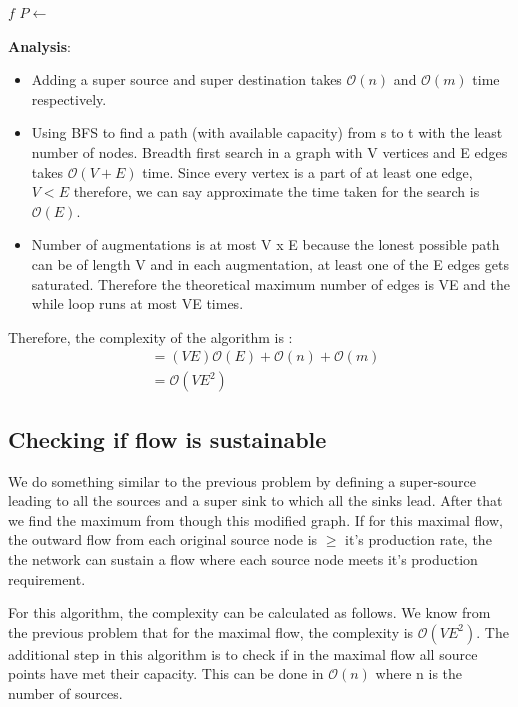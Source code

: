 \documentclass{article}
\begin{document}
\begin{algorithmic}
	\State {} $f$
		\State $P \gets $ 
		\State {}
		\State {}
		\State {}
	\EndWhile
\EndFunction
\end{algorithmic}

\textbf{Analysis}: 
\begin{itemize}
\item Adding a super source and super destination takes $\mathcal{O}(n)$ and $\mathcal{O}(m)$ time respectively.
\item Using BFS to find a path (with available capacity) from s to t with the least number of nodes. Breadth first search in a graph with V vertices and E edges takes $\mathcal{O}(V+E)$ time. Since every vertex is a part of at least one edge,  $V < E$ therefore, we can say approximate the time taken for the search is $\mathcal{O}(E)$.
\item Number of augmentations is at most V x E because the lonest possible path can be of length V and in each augmentation, at least one of the E edges gets saturated. Therefore the theoretical maximum number of edges is VE and the while loop runs at most VE times.
\end{itemize}

Therefore, the complexity of the algorithm is :
\begin{align*}
 & = (VE)\mathcal{O}(E) + \mathcal{O}(n) + \mathcal{O}(m) \\
 & = \mathcal{O}(VE^2)
\end{align*}

\subsection{Checking if flow is sustainable}
We do something similar to the previous problem by defining a super-source leading to all the sources and a super sink to which all the sinks lead. After that we find the maximum from though this modified graph. If for this maximal flow, the outward flow from each original source node is $\geq$ it's production rate, the the network can sustain a flow where each source node meets it's production requirement. 

For this algorithm, the complexity can be calculated as follows. We know from the previous problem that for the maximal flow, the complexity is $\mathcal{O}(VE^2)$. The additional step in this algorithm is to check if in the maximal flow all source points have met their capacity. This can be done in $\mathcal{O}(n)$ where n is the number of sources.
\end{document}
